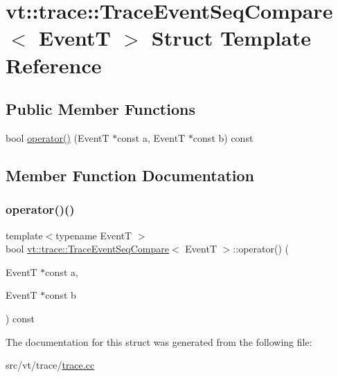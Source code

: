 \hypertarget{structvt_1_1trace_1_1_trace_event_seq_compare}{}\section{vt\+:\+:trace\+:\+:Trace\+Event\+Seq\+Compare$<$ EventT $>$ Struct Template Reference}
\label{structvt_1_1trace_1_1_trace_event_seq_compare}
\subsection*{Public Member Functions}
\begin{DoxyCompactItemize}
\item 
bool \hyperlink{structvt_1_1trace_1_1_trace_event_seq_compare_a74c92aa31dd3c4516bf4fb4b382db343}{operator()} (EventT $\ast$const a, EventT $\ast$const b) const
\end{DoxyCompactItemize}


\subsection{Member Function Documentation}
\mbox{\label{structvt_1_1trace_1_1_trace_event_seq_compare_a74c92aa31dd3c4516bf4fb4b382db343}} 
\subsubsection{\texorpdfstring{operator()()}{operator()()}}
{\footnotesize\ttfamily template$<$typename EventT $>$ \\
bool \hyperlink{structvt_1_1trace_1_1_trace_event_seq_compare}{vt\+::trace\+::\+Trace\+Event\+Seq\+Compare}$<$ EventT $>$\+::operator() (\begin{DoxyParamCaption}\item[{EventT $\ast$const}]{a,  }\item[{EventT $\ast$const}]{b }\end{DoxyParamCaption}) const\hspace{0.3cm}{\ttfamily [inline]}}



The documentation for this struct was generated from the following file\+:\begin{DoxyCompactItemize}
\item 
src/vt/trace/\hyperlink{trace_8cc}{trace.\+cc}\end{DoxyCompactItemize}
